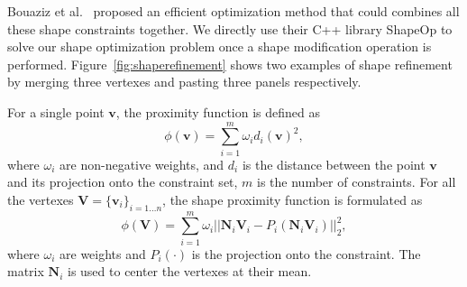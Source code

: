 {Bouaziz et al.~\cite{Bouaziz:2012:SSD:2346796.2346802} proposed an efficient optimization method that could combines all these shape constraints together. We directly use their C++ library ShapeOp to solve our shape optimization problem once a shape modification operation is performed.
Figure~\ref{fig:shaperefinement} shows two examples of shape refinement by merging three vertexes and pasting three panels respectively. 
 
%
For a single point $\mathbf{v}$, the proximity function is defined as
\begin{equation}
\phi(\mathbf{v}) = \sum_{i=1}^{m}\omega_i{d_i(\mathbf{v})}^{2},
\label{equ:function}
\end{equation}
where $\omega_i$ are non-negative weights, and $d_i$ is the distance between the point $\mathbf{v}$ and its projection onto the constraint set, $m$ is the number of constraints. For all the vertexes $\mathbf{V} = \{\mathbf{v}_i\}_{i=1\dots n}$, the shape proximity function is formulated as
\begin{equation}
\phi(\mathbf{V}) = \sum_{i=1}^{m}\omega_i||\mathbf{N}_i\mathbf{V}_i-P_i(\mathbf{N}_i\mathbf{V}_i)||_2^2,
\label{equ:function2}
\end{equation}
where $\omega_i$ are weights and $P_i(\cdot)$ is the projection onto the constraint. The matrix $\mathbf{N}_i$ is used to center the vertexes at their mean.

}
%

